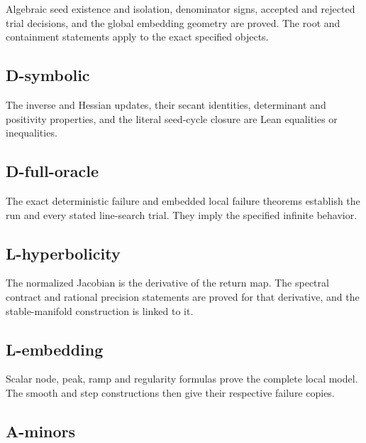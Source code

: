 Algebraic seed existence and isolation, denominator signs, accepted and rejected trial decisions, and the global embedding geometry are proved. The root and containment statements apply to the exact specified objects.



\subsection{D-symbolic}\label{d-symbolic}

The inverse and Hessian updates, their secant identities, determinant and positivity properties, and the literal seed-cycle closure are Lean equalities or inequalities.



\subsection{D-full-oracle}\label{d-full-oracle}

The exact deterministic failure and embedded local failure theorems establish the run and every stated line-search trial. They imply the specified infinite behavior.



\subsection{L-hyperbolicity}\label{l-hyperbolicity}

The normalized Jacobian is the derivative of the return map. The spectral contract and rational precision statements are proved for that derivative, and the stable-manifold construction is linked to it.



\subsection{L-embedding}\label{l-embedding}

Scalar node, peak, ramp and regularity formulas prove the complete local model. The smooth and step constructions then give their respective failure copies.



\subsection{A-minors}\label{a-minors}

